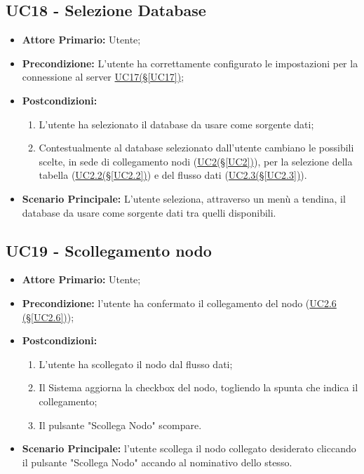 \pagebreak

\subsection{UC18 - Selezione Database}\label{UC18}
\begin{itemize}
	\item \textbf{Attore Primario:} Utente;
	\item \textbf{Precondizione:} L'utente ha correttamente configurato le impostazioni per la connessione al server \hyperref[UC17]{UC17(§\ref*{UC17})};
	\item \textbf{Postcondizioni:}
	\begin{enumerate}
		\item L'utente ha selezionato il database da usare come sorgente dati;
		\item Contestualmente al database selezionato dall'utente cambiano le possibili scelte, in sede di collegamento nodi (\hyperref[UC2]{UC2(§\ref*{UC2})}), per la selezione della tabella (\hyperref[UC2.2]{UC2.2(§\ref*{UC2.2})}) e del flusso dati (\hyperref[UC2.3]{UC2.3(§\ref*{UC2.3})}).
	\end{enumerate}
	\item \textbf{Scenario Principale:} L'utente seleziona, attraverso un menù a tendina, il database da usare come sorgente dati tra quelli disponibili.
\end{itemize}

\pagebreak

\subsection{UC19 - Scollegamento nodo}\label{UC19}
\begin{itemize}
	\item \textbf{Attore Primario:} Utente;
	\item \textbf{Precondizione:} l'utente ha confermato il collegamento del nodo (\hyperref[UC2.6]{UC2.6 									(§\ref*{UC2.6})});
	\item \textbf{Postcondizioni:}
	\begin{enumerate}
		\item L'utente ha scollegato il nodo dal flusso dati;
		\item Il Sistema aggiorna la checkbox del nodo, togliendo la spunta che indica il collegamento;
		\item Il pulsante "Scollega Nodo" scompare.
	\end{enumerate}
	\item \textbf{Scenario Principale:} l'utente scollega il nodo collegato desiderato cliccando il pulsante "Scollega Nodo" accando al nominativo dello stesso.
\end{itemize}

